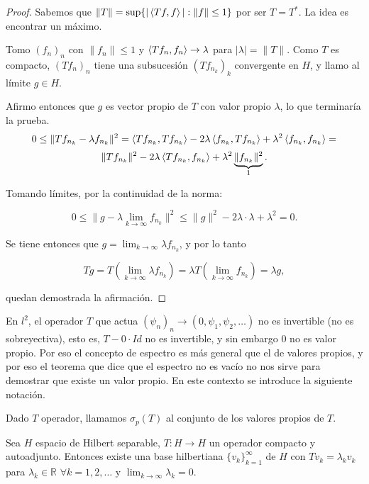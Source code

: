\begin{proof}
  Sabemos que $\|T\|=\sup \{|\left\langle Tf,f\right\rangle|:\|f\|\le 1\}$ por ser $T=T^*$. La
  idea es encontrar un máximo.

  Tomo $(f_n)_n$ con $\|f_n\|\le 1$ y $\left\langle Tf_n,f_n\right\rangle\to \lambda$ para
  $|\lambda|=\|T\|$. Como $T$ es compacto, $(Tf_n)_n$ tiene una subsucesión
  $(Tf_{n_k})_k$ convergente en $H$, y llamo al límite $g\in H$.

  Afirmo entonces que $g$ es vector propio de $T$ con valor propio $\lambda$, lo
  que terminaría la prueba.
  \[
  0\le \|Tf_{n_k}-\lambda f_{n_k}\|^2 =
  \left\langle Tf_{n_k},Tf_{n_k}\right\rangle-2\lambda\left\langle f_{n_k},Tf_{n_k}\right\rangle+\lambda^2
  \left\langle f_{n_k},f_{n_k}\right\rangle=
  \] 
  \[
  \|Tf_{n_k}\|^2-2\lambda\left\langle Tf_{n_k},f_{n_k}\right\rangle + \lambda^2
  \underbrace{\|f_{n_k}\|^2}_{1}
  .\] 

  Tomando límites, por la continuidad de la norma:

  \[
  0\le \|g-\lambda \lim_{k \to \infty} f_{n_k}\|^2 \le 
  \|g\|^2-2\lambda\cdot \lambda + \lambda^2=0
  .\] 
  
  Se tiene entonces que $g=\lim_{k \to \infty} \lambda f_{n_k}$, y por lo tanto

  \[
  Tg = T(\lim_{k \to \infty} \lambda f_{n_k})=\lambda T(\lim_{k \to \infty}
  f_{n_k})=\lambda g
  ,\] 

  quedan demostrada la afirmación.

\end{proof}

\begin{remark}
  En $l^2$, el operador $T$ que actua $(\psi_n)_n\to (0,\psi_1,\psi_2,\ldots)$
  no es invertible (no es sobreyectiva), esto es, $T-0\cdot Id$ no es
  invertible, y sin embargo $0$ no es valor propio. Por eso el concepto de
  espectro es más general que el de valores propios, y por eso el teorema que
  dice que el espectro no es vacío no nos sirve para demostrar que existe un
  valor propio. En este contexto se introduce la siguiente notación.
\end{remark}

\begin{definition}
  Dado $T$ operador, llamamos $\sigma_p(T)$ al conjunto de los valores propios
  de $T$.
\end{definition}

\begin{theorem}
  \label{th:hilbert-schmidt}
  Sea $H$ espacio de Hilbert separable, $T:H\to H$ un operador compacto y
  autoadjunto. Entonces existe una base hilbertiana $\{v_k\}_{k=1}^\infty$ de $H$ 
  con $Tv_k=\lambda_k v_k$ para $\lambda_k\in \mathbb{R}$ $\forall k=1,2,\ldots$ y
  $\lim_{k \to \infty} \lambda_k=0$.
\end{theorem}

